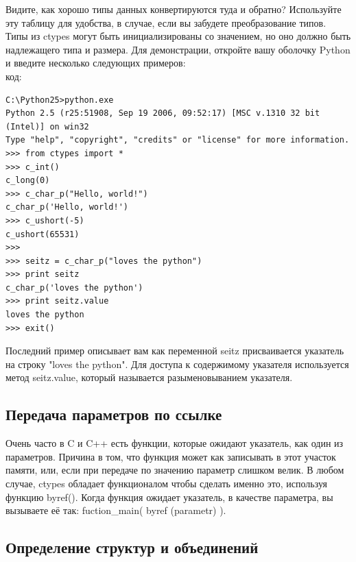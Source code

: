 \documentclass[12pt, a4paper, oneside]{book}
\begin{document}
Видите, как хорошо типы данных конвертируются туда и обратно? Используйте эту таблицу для удобства, в случае, если вы забудете преобразование типов. Типы из ctypes могут быть инициализированы со значением, но оно должно быть надлежащего типа и размера. Для демонстрации, откройте вашу оболочку Python и введите несколько следующих примеров:\\
код:
\begin{verbatim}
C:\Python25>python.exe
Python 2.5 (r25:51908, Sep 19 2006, 09:52:17) [MSC v.1310 32 bit (Intel)] on win32
Type "help", "copyright", "credits" or "license" for more information.
>>> from ctypes import *
>>> c_int()
c_long(0)
>>> c_char_p("Hello, world!")
c_char_p('Hello, world!')
>>> c_ushort(-5)
c_ushort(65531)
>>>
>>> seitz = c_char_p("loves the python")
>>> print seitz
c_char_p('loves the python')
>>> print seitz.value
loves the python
>>> exit()
\end{verbatim}

Последний пример описывает вам как переменной seitz присваивается указатель на строку "loves the python". Для доступа к содержимому указателя используется метод seitz.value, который называется разыменовыванием указателя.\\

\subsection{Передача параметров по ссылке}

Очень часто в C и C++ есть функции, которые ожидают указатель, как один из параметров. Причина в том, что функция может как записывать в этот участок памяти, или, если при передаче по значению параметр слишком велик. В любом случае, ctypes обладает функционалом чтобы сделать именно это, используя функцию byref(). Когда функция ожидает указатель, в качестве параметра, вы вызываете её так: fuction_main( byref (parametr) ).\\

\subsection{Определение структур и объединений}
\end{document}
